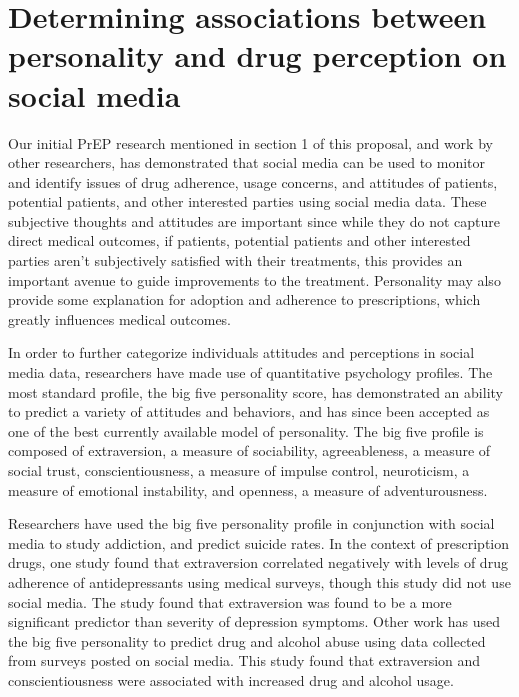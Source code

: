 \section{Determining associations between personality and drug perception on social media}

Our initial PrEP research mentioned in section 1 of this proposal, and work by other researchers, has demonstrated that social media can be used to monitor and identify issues of drug adherence, usage concerns, and attitudes of patients, potential patients, and other interested parties using social media data. These subjective thoughts and attitudes are important since while they do not capture direct medical outcomes, if patients, potential patients and other interested parties aren't subjectively satisfied with their treatments, this provides an important avenue to guide improvements to the treatment. Personality may also provide some explanation for adoption and adherence to prescriptions, which greatly influences medical outcomes.

In order to further categorize individuals attitudes and perceptions in social media data, researchers have made use of quantitative psychology profiles. The most standard profile, the big five personality score\cite{gosling2003very}, has demonstrated an ability to predict a variety of attitudes and behaviors, and has since been accepted as one of the best currently available model of personality. The big five profile is composed of extraversion, a measure of sociability, agreeableness, a measure of social trust, conscientiousness, a measure of impulse control, neuroticism, a measure of emotional instability, and openness, a measure of adventurousness.

Researchers have used the big five personality profile in conjunction with social media to study addiction\cite{andreassen2013relationships}, and predict suicide rates\cite{jashinsky2014tracking}. In the context of prescription drugs, one study found that extraversion correlated negatively with levels of drug adherence of antidepressants using medical surveys\cite{cohen20045}, though this study did not use social media. The study found that extraversion was found to be a more significant predictor than severity of depression symptoms. Other work has used the big five personality to predict drug and alcohol abuse\cite{livingston2015role} using data collected from surveys posted on social media. This study found that extraversion and conscientiousness were associated with increased drug and alcohol usage.

